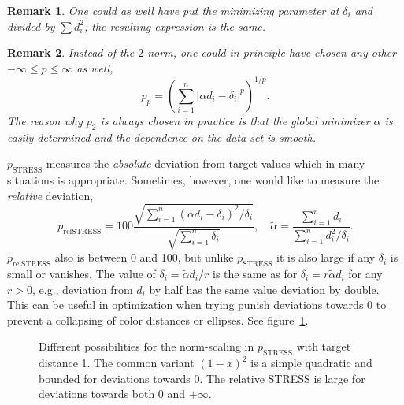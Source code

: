 \documentclass{scrartcl}
\newtheorem*{remark}{Remark}
\theoremstyle{named}
\begin{document}
\begin{remark}
One could as well have put the minimizing parameter at $\delta_i$ and divided by $\sum
  d_i^2$; the resulting expression is the same.
\end{remark}

\begin{remark}
Instead of the $2$-norm, one could in principle have chosen any other $-\infty\le
  p\le\infty$ as well,
\[
p_p = \left(\sum_{i=1}^n |\alpha d_i - \delta_i|^p\right)^{1/p}.
\]
The reason why $p_2$ is always chosen in practice is that the global minimizer $\alpha$
  is easily determined and the dependence on the data set is smooth.
\end{remark}

$p_\text{STRESS}$ measures the \emph{absolute} deviation from target values which in
many situations is appropriate. Sometimes, however, one would like to measure the
\emph{relative} deviation,
\[
  p_\text{relSTRESS} = 100 \frac{\sqrt{\sum_{i=1}^n (\tilde{\alpha} d_i -
  \delta_i)^2 / \delta_i}}{\sqrt{\sum_{i=1}^n \delta_i}}, \quad
  \tilde{\alpha} = \frac{\sum_{i=1}^n d_i}{\sum_{i=1}^n d_i^2 / \delta_i}.
\]
$p_\text{relSTRESS}$ also is between 0 and 100, but unlike $p_\text{STRESS}$ it
is also large if any $\delta_i$ is small or vanishes.
The value of $\delta_i=\tilde{\alpha} d_i / r$ is the same as for $\delta_i = r
\tilde{\alpha} d_i$ for any $r > 0$, e.g., deviation from $d_i$ by half has the same
value deviation by double.
This can be useful in optimization when trying punish deviations
towards 0 to prevent a collapsing of color distances or ellipses.
See figure~\ref{fig:norm-scaling}.

\begin{figure}
  \label{fig:norm-scaling}
  \centering
  
  \caption{Different possibilities for the norm-scaling in $p_\text{STRESS}$ with target
  distance 1. The common variant $(1-x)^2$ is a simple quadratic and bounded for
  deviations towards 0. The relative STRESS is large for deviations towards both 0 and
  $+\infty$.}
\end{figure}

%   
%   
%   
\end{document}
